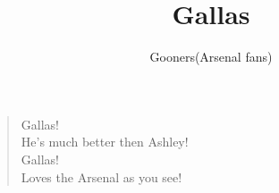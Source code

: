 \documentclass[a4paper,12pt]{article}
\title{Gallas}
\author{Gooners(Arsenal fans)}
\date{}
\begin{document}
	
	\maketitle
	
	\begin{verse}
		
		Gallas! \\
		He's much better then Ashley! \\
		Gallas! \\
		Loves the Arsenal as you see!
		
	\end{verse}
	
\end{document}
